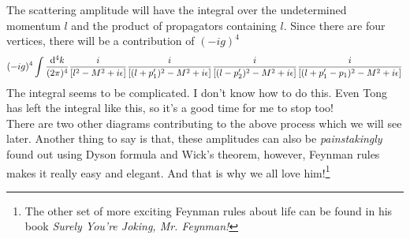 The scattering amplitude will have the integral over the undetermined momentum $l$ and the product of propagators containing $l$. Since there are four vertices, there will be a contribution of $(-ig)^4$ 
$$(-ig)^4 \int \frac{\dd^4k}{(2\pi)^4} \frac{i}{\qty[l^2-M^2+i\epsilon]}\frac{i}{\qty[(l+p_1')^2-M^2+i\epsilon]}\frac{i}{\qty[(l-p_2')^2-M^2+i\epsilon]}\frac{i}{\qty[(l+p_1'-p_1)^2-M^2+i\epsilon]}$$
The integral seems to be complicated. I don't know how to do this. Even Tong has left the integral like this, so it's a good time for me to stop too!\\[0.2cm]
There are two other diagrams contributing to the above process which we will see later. Another thing to say is that, these amplitudes can also be \textit{painstakingly} found out using Dyson formula and Wick's theorem, however, Feynman rules makes it really easy and elegant. And that is why we all love him!\footnote{The other set of more exciting Feynman rules about life can be found in his book \textit{Surely You're Joking, Mr. Feynman!}}